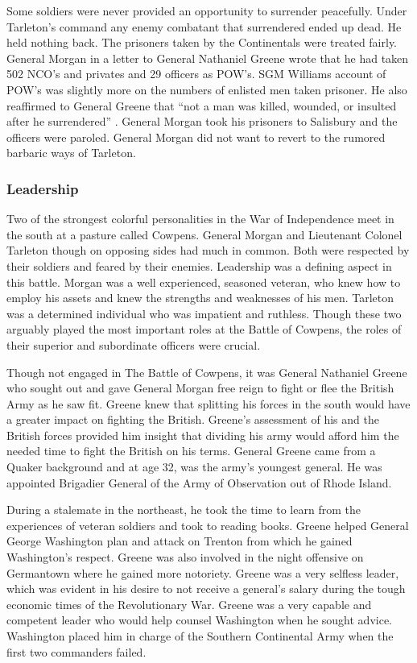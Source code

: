 Some soldiers were never provided an opportunity to surrender peacefully. Under
Tarleton’s command any enemy combatant that surrendered ended up dead.  He held
nothing back. The prisoners taken by the Continentals were treated fairly.
General Morgan in a letter to General Nathaniel Greene wrote that he had taken
502 NCO’s and privates and 29 officers as POW’s.  SGM Williams account of POW’s
was slightly more on the numbers of enlisted men taken prisoner. He also
reaffirmed to General Greene that “not a man was killed, wounded, or insulted
after he surrendered” \cite[p.122]{moncure_cowpens_1996}.  General Morgan took his prisoners to
Salisbury and the officers were paroled. General Morgan did not want to revert
to the rumored barbaric ways of Tarleton. 

\subsubsection{Leadership}

Two of the strongest colorful personalities in the War of Independence meet in
the south at a pasture called Cowpens. General Morgan and Lieutenant Colonel
Tarleton though on opposing sides had much in common. Both were respected by
their soldiers and feared by their enemies. Leadership was a defining aspect in
this battle.  Morgan was a well experienced, seasoned veteran, who knew how to
employ his assets and knew the strengths and weaknesses of his men.  Tarleton
was a determined individual who was impatient and ruthless. Though these two
arguably played the most important roles at the Battle of Cowpens, the roles of
their superior and subordinate officers were crucial. 

Though not engaged in The Battle of Cowpens, it was General Nathaniel Greene who
sought out and gave General Morgan free reign to fight or flee the British Army
as he saw fit.  Greene knew that splitting his forces in the south would have a
greater impact on fighting the British. Greene’s assessment of his and the
British forces provided him insight that dividing his army would afford him the
needed time to fight the British on his terms. General Greene came from a Quaker
background and at age 32, was the army’s youngest general. He was appointed
Brigadier General of the Army of Observation out of Rhode Island.

During a stalemate in the northeast, he took the time to learn from the
experiences of veteran soldiers and took to reading books. Greene helped General
George Washington plan and attack on Trenton from which he gained Washington’s
respect. Greene was also involved in the night offensive on Germantown where he
gained more notoriety. Greene was a very selfless leader, which was evident in
his desire to not receive a general’s salary during the tough economic times of
the Revolutionary War. Greene was a very capable and competent leader who would
help counsel Washington when he sought advice.  Washington placed him in charge
of the Southern Continental Army when the first two commanders failed. 

